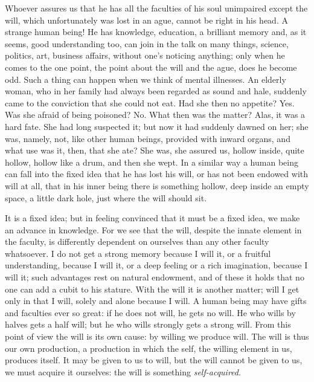\documentclass[12pt,a4paper,openany]{book}
\newcommand{\opage}[1]{\marginnote{\footnotesize\textit{[#1]}}}
\begin{document}
Whoever assures us that he has all the faculties of his soul unimpaired
except the will, which unfortunately was lost in an ague,
cannot be right in his head. A strange
human being! He has knowledge, education, a brilliant memory
and, as it seems, good understanding too, can join
in the talk on many things, science, politics, art, business affairs,
without one's noticing anything; only when he comes
to the one point, the point about the will and the ague,
does he become odd. Such a thing can happen when we think
of mental illnesses. An elderly woman, who in her family
had always been regarded as sound and hale, suddenly came
to the conviction that she could not eat. Had
she then no appetite? Yes. Was she afraid of being
poisoned? No. What then was the matter? Alas, it was
a hard fate. She had long suspected it; but now
it had suddenly dawned on her; she was, namely,
not, like other human beings, provided with inward organs,
and what use was it, then, that she ate? She was,
she assured us, hollow inside, quite hollow, hollow like a
drum, and then she wept. In a similar way a
human being can fall into the fixed idea that he has lost his will,
or has not been endowed with will at all, that in his
inner being there is something hollow, deep inside an empty space, a little
dark hole, just where the will should sit.

It is a fixed idea; but in feeling convinced
that it must be a fixed idea, we make an advance in
knowledge. For we see that the will, despite the innate
element in the faculty, is differently dependent on ourselves than any other
faculty whatsoever. I do not get a strong memory
because I will it, or a fruitful understanding, because I
\setcounter{footnote}{0}%
\opage{4}will it, or a deep feeling or a rich imagination,
because I will it; such advantages rest on natural endowment,
and of these it holds that no one can add a cubit to his
stature. With the will it is another matter; will I get
only in that I will, solely and alone because I will. A human being
may have gifts and faculties ever so great: if
he does not will, he gets no will. He who wills
by halves gets a half will; but he who wills strongly gets
a strong will. From this point of view the will is its own
cause: by willing we produce will. The will is thus
our own production, a production in which the self,
the willing element in us, produces itself. It may be given to us to
will, but the will cannot be given to us, we must acquire it
ourselves: the will is something \emph{self-acquired}.
\end{document}
